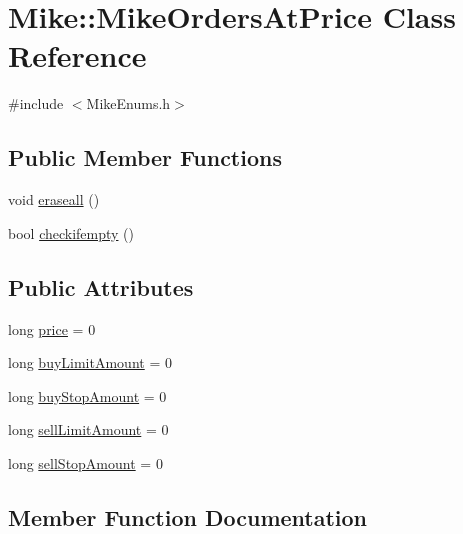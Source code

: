 \hypertarget{class_mike_1_1_mike_orders_at_price}{}\section{Mike\+:\+:Mike\+Orders\+At\+Price Class Reference}
\label{class_mike_1_1_mike_orders_at_price}


{\ttfamily \#include $<$Mike\+Enums.\+h$>$}

\subsection*{Public Member Functions}
\begin{DoxyCompactItemize}
\item 
void \hyperlink{class_mike_1_1_mike_orders_at_price_a75b42dff63234fb5b8a2d2f30b9bea47}{eraseall} ()
\item 
bool \hyperlink{class_mike_1_1_mike_orders_at_price_a40d606d7b8902199a2ca73f1b85721bb}{checkifempty} ()
\end{DoxyCompactItemize}
\subsection*{Public Attributes}
\begin{DoxyCompactItemize}
\item 
long \hyperlink{class_mike_1_1_mike_orders_at_price_af960da71d8dac99d0828a81d306eddae}{price} = 0
\item 
long \hyperlink{class_mike_1_1_mike_orders_at_price_ae3ffe4271c193a1a9aea2d8e945ae855}{buy\+Limit\+Amount} = 0
\item 
long \hyperlink{class_mike_1_1_mike_orders_at_price_ad4267dc038aa740ef12adfa448ba8fef}{buy\+Stop\+Amount} = 0
\item 
long \hyperlink{class_mike_1_1_mike_orders_at_price_a3ef4691e1282e3df22fec5f9160f0a9a}{sell\+Limit\+Amount} = 0
\item 
long \hyperlink{class_mike_1_1_mike_orders_at_price_a44e72f9cec02a0ac780ab07733da3a8a}{sell\+Stop\+Amount} = 0
\end{DoxyCompactItemize}


\subsection{Member Function Documentation}
\mbox{\label{class_mike_1_1_mike_orders_at_price_a40d606d7b8902199a2ca73f1b85721bb}} 
